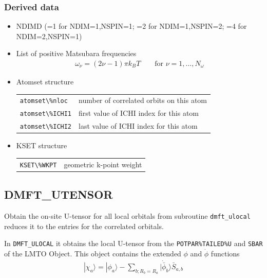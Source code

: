 \documentclass[11pt,a4paper]{report}
\begin{document}
\subsubsection{Derived data}
\begin{itemize}
\item NDIMD (=1 for NDIM=1,NSPIN=1; =2 for NDIM=1,NSPIN=2; =4 for
  NDIM=2,NSPIN=1)
\item List of positive Matsubara frequencies
\begin{eqnarray}
\omega_\nu=(2\nu-1)\pi k_BT \qquad\text{for $\nu=1,\ldots,N_\omega$}
\end{eqnarray}
\item Atomset structure
\begin{center}
 \begin{tabular}{ll}
 \verb|atomset\%nloc| & number of correlated orbits on this atom \\
\verb|atomset\%ICHI1| & first value of ICHI index for this atom\\
\verb|atomset\%ICHI2| & last value of ICHI index for this atom\\
\end{tabular}
\end{center}
%
\item KSET structure
\begin{center}
 \begin{tabular}{ll}
 \verb|KSET\%WKPT| & geometric k-point weight\\
\end{tabular}
\end{center}
\end{itemize}

\subsection{DMFT\_UTENSOR}
\label{sec:routinedmftutensor}
Obtain the on-site U-tensor for all local orbitals from
subroutine \verb|dmft_ulocal| reduces it to the entries for the
correlated orbitals.

In \verb|DMFT_ULOCAL| it obtains the local U-tensor from the
\verb|POTPAR%TAILED%U| and \verb|SBAR| of the LMTO Object. This object
contains the extended $\phi$ and $\dot{\phi}$ functions
\begin{eqnarray}
|\chi_a\rangle=|\phi_a\rangle-
\sum_{b; R_b=R_a}|\dot{\bar{\phi}}_b\rangle \bar{S}_{a,b}
\end{eqnarray}
\end{document}
